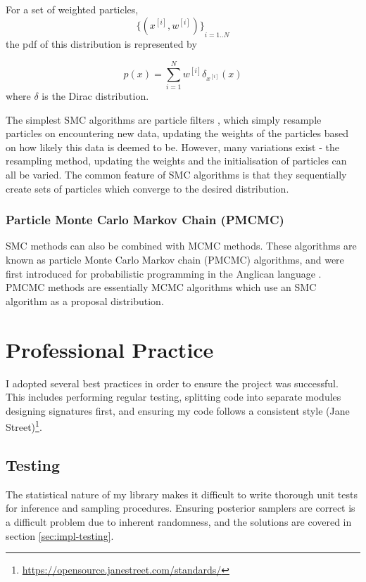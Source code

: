 For a set of weighted particles, 
\[{\{(x^{[i]}, w^{[i]})\}}_{i=1..N}\]
the pdf of this distribution is represented by

\[
	p(x) = \sum_{i=1}^{N}w^{[i]}\delta_{x^{[i]}}(x)
\]
where $\delta$ is the Dirac distribution.

The simplest SMC algorithms are particle filters \cite{particlefilter}, which simply resample particles on encountering new data, updating the weights of the particles based on how likely this data is deemed to be. However, many variations exist - the resampling method, updating the weights and the initialisation of particles can all be varied. The common feature of SMC algorithms is that they sequentially create sets of particles which converge to the desired distribution.

\subsubsection{Particle Monte Carlo Markov Chain (PMCMC)}
SMC methods can also be combined with MCMC methods. These algorithms are known as particle Monte Carlo Markov chain (PMCMC) algorithms, and were first introduced for probabilistic programming in the Anglican language \cite{anglican-smc}. PMCMC methods are essentially MCMC algorithms which use an SMC algorithm as a proposal distribution.
		
		
\section{Professional Practice}
		
I adopted several best practices in order to ensure the project was successful. This includes performing regular testing, splitting code into separate modules designing signatures first, and ensuring my code follows a consistent style (Jane Street)\footnote{\url{https://opensource.janestreet.com/standards/}}.
		
\subsection{Testing} \label{sec:prep-testing}
The statistical nature of my library makes it difficult to write thorough unit tests for inference and sampling procedures. Ensuring posterior samplers are correct is a difficult problem due to inherent randomness, and the solutions are covered in section \ref{sec:impl-testing}.

